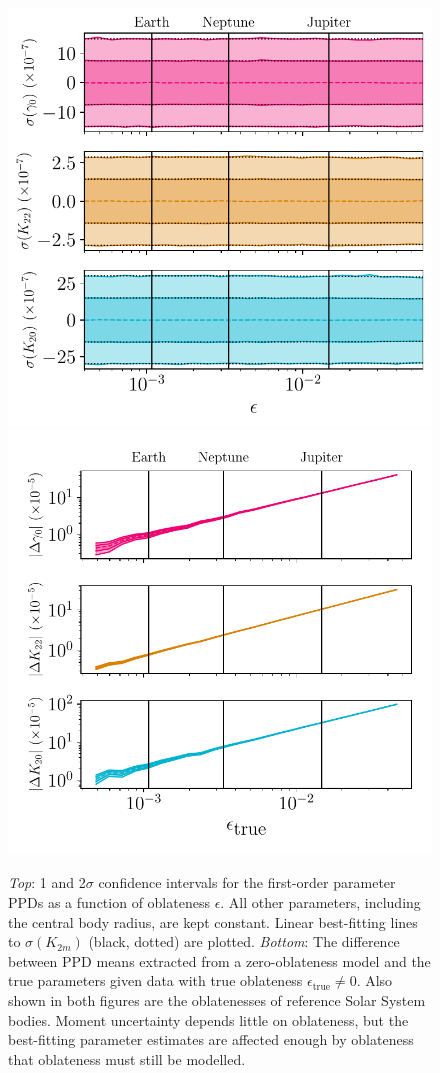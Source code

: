 \documentclass[fleqn,usenatbib]{mnras}
\begin{document}
\begin{figure}
  \centering
  \includegraphics[width=0.7\columnwidth]{figs/oblateness.pdf}
  \vfill
  \includegraphics[width=0.7\columnwidth]{figs/oblateness-differ.pdf}
  \caption{\textit{Top}: 1 and 2$\sigma$ confidence intervals for the first-order parameter PPDs as a function of oblateness $\epsilon$. All other parameters, including the central body radius, are kept constant. Linear best-fitting lines to $\sigma(K_{2m})$ (black, dotted) are plotted. \textit{Bottom}: The difference between PPD means extracted from a zero-oblateness model and the true parameters given data with true oblateness $\epsilon_\text{true} \neq 0$. Also shown in both figures are the oblatenesses of reference Solar System bodies. Moment uncertainty depends little on oblateness, but the best-fitting parameter estimates are affected enough by oblateness that oblateness must still be modelled.}
  \label{fig:scan-oblateness}
\end{figure}
\end{document}
